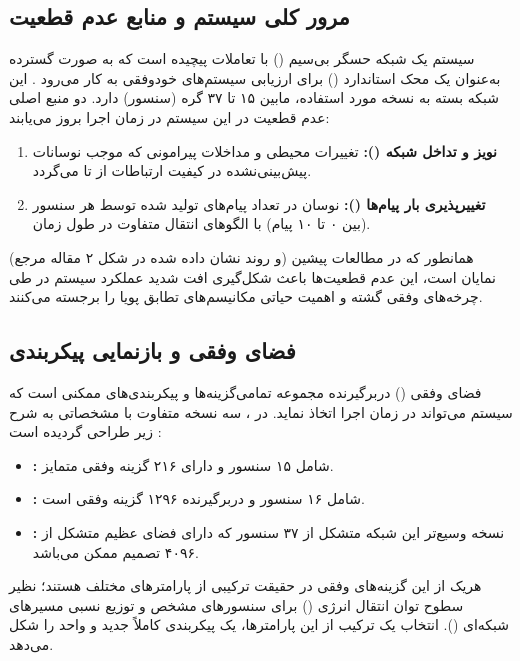 \documentclass[oneside,openany,phd]{TMU-Thesis}
\begin{document}
\subsection{مرور کلی سیستم و منابع عدم قطعیت}

سیستم  یک شبکه حسگر بی‌سیم () با تعاملات پیچیده است که به صورت گسترده به‌عنوان یک محک استاندارد () برای ارزیابی سیستم‌های خودوفقی به کار می‌رود \cite{RS_DRL_Article}. این شبکه بسته به نسخه مورد استفاده، مابین ۱۵ تا ۳۷ گره (سنسور) دارد. دو منبع اصلی عدم قطعیت در این سیستم در زمان اجرا بروز می‌یابند:
\begin{enumerate}
    \item \textbf{نویز و تداخل شبکه ():} تغییرات محیطی و مداخلات پیرامونی که موجب نوسانات پیش‌بینی‌نشده در کیفیت ارتباطات از  تا  می‌گردد.
    \item \textbf{تغییرپذیری بار پیام‌ها ():} نوسان در تعداد پیام‌های تولید شده توسط هر سنسور (بین ۰ تا ۱۰ پیام) با الگوهای انتقال متفاوت در طول زمان.
\end{enumerate}

همانطور که در مطالعات پیشین (و روند نشان داده شده در شکل ۲ مقاله مرجع) نمایان است، این عدم قطعیت‌ها باعث شکل‌گیری افت شدید عملکرد سیستم در طی چرخه‌های وفقی گشته و اهمیت حیاتی مکانیسم‌های تطابق پویا را برجسته می‌کنند.

\subsection{فضای وفقی و بازنمایی پیکربندی}

فضای وفقی () دربرگیرنده مجموعه تمامی‌گزینه‌ها و پیکربندی‌های ممکنی است که سیستم می‌تواند در زمان اجرا اتخاذ نماید. در ، سه نسخه متفاوت با مشخصاتی به شرح زیر طراحی گردیده است \cite{RS_DRL_Article}:
\begin{itemize}
    \item \textbf{:} شامل ۱۵ سنسور و دارای ۲۱۶ گزینه وفقی متمایز.
    \item \textbf{:} شامل ۱۶ سنسور و دربرگیرنده ۱۲۹۶ گزینه وفقی است.
    \item \textbf{:} نسخه وسیع‌تر این شبکه متشکل از ۳۷ سنسور که دارای فضای عظیم متشکل از ۴۰۹۶ تصمیم ممکن می‌باشد.
\end{itemize}

هریک از این گزینه‌های وفقی در حقیقت ترکیبی از پارامترهای مختلف هستند؛ نظیر سطوح توان انتقال انرژی () برای سنسورهای مشخص و توزیع نسبی مسیرهای شبکه‌ای (). انتخاب یک ترکیب از این پارامترها، یک پیکربندی کاملاً جدید و واحد را شکل می‌دهد.
\end{document}

